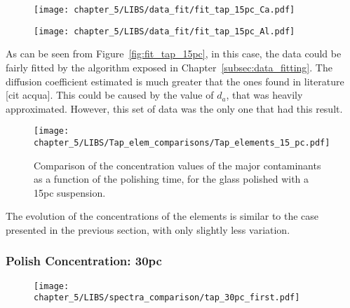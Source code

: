 \begin{figure}[H]
    \centering
    \texttt{[image: chapter\_5/LIBS/data\_fit/fit\_tap\_15pc\_Ca.pdf]} 
 \end{figure}
    \vspace{-40pt}
 \begin{figure}[H]
    \centering
    \texttt{[image: chapter\_5/LIBS/data\_fit/fit\_tap\_15pc\_Al.pdf]} 
 \end{figure}

 \vspace{-20pt}

 As can be seen from Figure~\ref{fig:fit_tap_15pc}, in this case, the data could be fairly fitted by the algorithm exposed in Chapter~\ref{subsec:data_fitting}. The diffusion coefficient estimated is much greater that the ones found in literature [cit acqua]. This could be caused by the value of $d_a$, that was heavily approximated. However, this set of data was the only one that had this result.

 \vspace{-20pt}
 \begin{figure}[H]
    \centering
    \texttt{[image: chapter\_5/LIBS/Tap\_elem\_comparisons/Tap\_elements\_15\_pc.pdf]} 
    \vspace*{-30pt}
    \caption{Comparison of the concentration values of the major contaminants as a function of the polishing time, for the glass polished with a 15pc suspension.}
    \label{fig:tap_elem_15pc}
 \end{figure}

 The evolution of the concentrations of the elements is similar to the case presented in the previous section, with only slightly less variation.









 \subsubsection{Polish Concentration: 30pc}
 \label{subsubsec:30pc}
 \vspace*{-25pt}
 \begin{figure}[H]
     \centering
     \texttt{[image: chapter\_5/LIBS/spectra\_comparison/tap\_30pc\_first.pdf]} 
  \end{figure}
 
